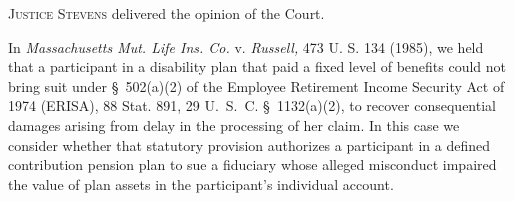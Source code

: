 
\setcounter{page}{250}

  \textsc{Justice Stevens} delivered the opinion of the Court.

  In \emph{Massachusetts Mut. Life Ins. Co.} v. \emph{Russell,} 473 U. S. 134 (1985), we held that a participant in a disability plan that paid a fixed level of benefits could not bring suit under \S~502(a)(2) of the Employee Retirement Income Security Act of 1974 (ERISA), 88 Stat. 891, 29 U.~S.~C. \S~1132(a)(2), to recover consequential damages arising from delay in the processing of her claim. In this case we consider whether that statutory provision authorizes a participant in a defined contribution pension plan to sue a fiduciary whose alleged misconduct impaired the value of plan assets in the participant's individual account.\footnotemark[1]

